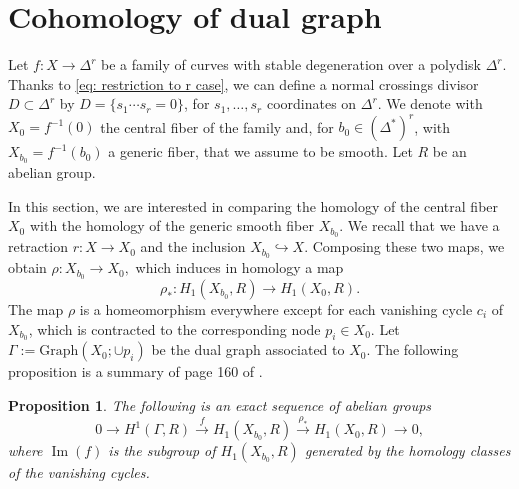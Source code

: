 \documentclass[a4paper,12 pt,titlepage,twoside]{book}
\DeclareMathOperator{\Ima}{Im}
\theoremstyle{plain}
\theoremstyle{theorem}
\newtheorem{prop}[thm]{Proposition}
\theoremstyle{definition}
\theoremstyle{remark}
\begin{document}
	\section{Cohomology of dual graph}\label{sec: cohomology dual graph}
	Let $f \colon X \rightarrow \Delta^r$ be a family of curves with stable degeneration over a polydisk $\Delta^r$. Thanks to \eqref{eq: restriction to r case}, we can define a normal crossings divisor $D \subset \Delta^r$ by $D= \{s_1 \cdots s_r =0\}$, for $s_1,\dots,s_r$ coordinates on $\Delta^r$. We denote with $X_0 = f^{-1}(0)$ the central fiber of the family and, for $b_0 \in (\Delta^*)^r$, with $X_{b_0} = f^{-1}(b_0)$ a generic fiber, that we assume to be smooth. Let $R$ be an abelian group.
	
	In this section, we are interested in comparing the homology of the central fiber $X_0$ with the homology of the generic smooth fiber $X_{b_0}$. We recall that we have a retraction $r \colon X \rightarrow X_0$ and the inclusion $X_{b_0} \hookrightarrow X.$ Composing these two maps, we obtain $\rho \colon X_{b_0} \rightarrow X_0,$ which induces in homology a map $$\rho_* \colon H_1(X_{b_0},R) \rightarrow H_1(X_0,R).$$ The map $\rho$ is a homeomorphism everywhere except for each vanishing cycle $c_i$ of $X_{b_0}$, which is contracted to the corresponding node $p_i \in X_0$. Let $\Gamma := \text{Graph}(X_0; \cup p_i)$ be the dual graph associated to $X_0.$ The following proposition is a summary of page 160 of \cite{MR2807457}.
	\begin{prop}\label{prop: relation X0 and Xb0}
		The following is an exact sequence of abelian groups $$0 \rightarrow H^1(\Gamma,R) \stackrel{f}{\longrightarrow} H_1(X_{b_0},R) \stackrel{\rho_*}{\longrightarrow} H_1(X_0,R) \rightarrow 0,$$ where $\Ima(f)$ is the subgroup of $H_1(X_{b_0},R)$ generated by the homology classes of the vanishing cycles. 
	\end{prop}
\end{document}
